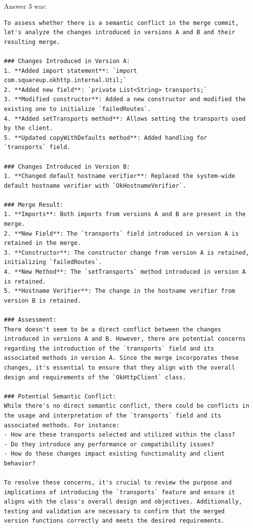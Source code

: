 Answer 3 was:
\begin{lstlisting}
To assess whether there is a semantic conflict in the merge commit, let's analyze the changes introduced in versions A and B and their resulting merge.

### Changes Introduced in Version A:
1. **Added import statement**: `import com.squareup.okhttp.internal.Util;`
2. **Added new field**: `private List<String> transports;`
3. **Modified constructor**: Added a new constructor and modified the existing one to initialize `failedRoutes`.
4. **Added setTransports method**: Allows setting the transports used by the client.
5. **Updated copyWithDefaults method**: Added handling for `transports` field.

### Changes Introduced in Version B:
1. **Changed default hostname verifier**: Replaced the system-wide default hostname verifier with `OkHostnameVerifier`.

### Merge Result:
1. **Imports**: Both imports from versions A and B are present in the merge.
2. **New Field**: The `transports` field introduced in version A is retained in the merge.
3. **Constructor**: The constructor change from version A is retained, initializing `failedRoutes`.
4. **New Method**: The `setTransports` method introduced in version A is retained.
5. **Hostname Verifier**: The change in the hostname verifier from version B is retained.

### Assessment:
There doesn't seem to be a direct conflict between the changes introduced in versions A and B. However, there are potential concerns regarding the introduction of the `transports` field and its associated methods in version A. Since the merge incorporates these changes, it's essential to ensure that they align with the overall design and requirements of the `OkHttpClient` class.

### Potential Semantic Conflict:
While there's no direct semantic conflict, there could be conflicts in the usage and interpretation of the `transports` field and its associated methods. For instance:
- How are these transports selected and utilized within the class?
- Do they introduce any performance or compatibility issues?
- How do these changes impact existing functionality and client behavior?

To resolve these concerns, it's crucial to review the purpose and implications of introducing the `transports` feature and ensure it aligns with the class's overall design and objectives. Additionally, testing and validation are necessary to confirm that the merged version functions correctly and meets the desired requirements.
\end{lstlisting}

